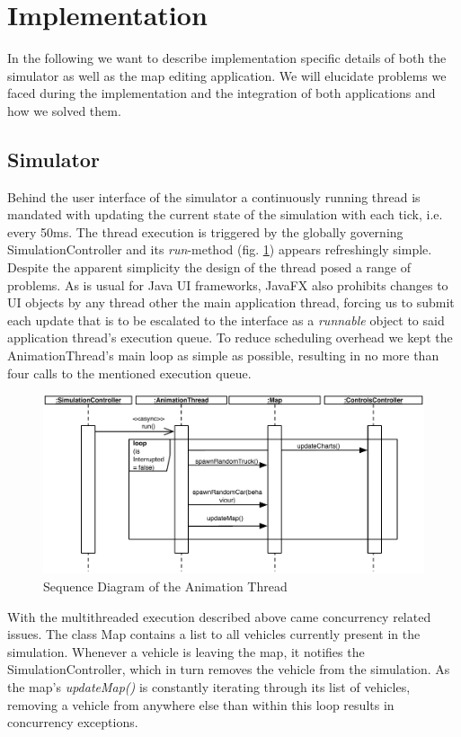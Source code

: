 \section{Implementation}
In the following we want to describe implementation specific details of both the simulator as well as the map editing application. We will elucidate problems we faced during the implementation and the integration of both applications and how we solved them. 
\subsection{Simulator}
Behind the user interface of the simulator a continuously running thread is mandated with updating the current state of the simulation with each tick, i.e. every 50ms. The thread execution is triggered by the globally governing SimulationController and its \textit{run}-method (fig. \ref{sd_animthread}) appears refreshingly simple. Despite the apparent simplicity the design of the thread posed a range of problems. As is usual for Java UI frameworks, JavaFX also prohibits changes to UI objects by any thread other the main application thread, forcing us to submit each update that is to be escalated to the interface as a \textit{runnable} object to said application thread's execution queue. To reduce scheduling overhead we kept the AnimationThread's main loop as simple as possible, resulting in no more than four calls to the mentioned execution queue. 

\begin{figure}[h]
	\begin{center}
		\includegraphics[width=\textwidth]{img/SD_animThread.pdf}
		\caption[Sequence Diagram of the Animation Thread]{Sequence Diagram of the Animation Thread}
		\label{sd_animthread}
	\end{center}
\end{figure}

With the multithreaded execution described above came concurrency related issues. The class Map contains a list to all vehicles currently present in the simulation. Whenever a vehicle is leaving the map, it notifies the SimulationController, which in turn removes the vehicle from the simulation. As the map's \textit{updateMap()} is constantly iterating through its list of vehicles, removing a vehicle from anywhere else than within this loop results in concurrency exceptions.

